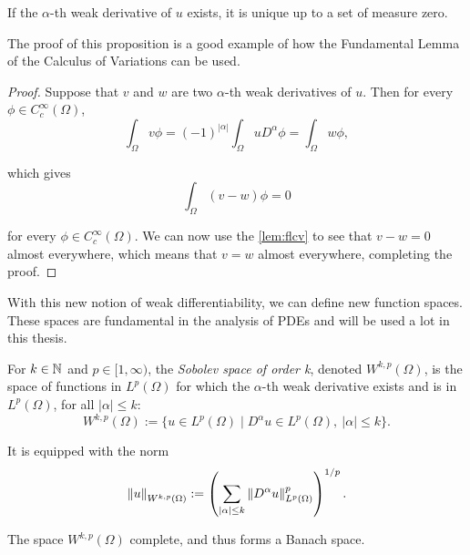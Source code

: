 \begin{proposition}{}{}
    If the $\alpha$-th weak derivative of $u$ exists, it is unique up to a set of measure zero.
\end{proposition}

The proof of this proposition is a good example of how the Fundamental Lemma of the Calculus of Variations can be used.

\begin{proof}
    Suppose that $v$ and $w$ are two $\alpha$-th weak derivatives of $u$. Then for every $\phi \in C^{\infty}_{c}(\Omega)$,
    \begin{equation*}
        \int_{\Omega} v \phi = (-1)^{|\alpha|} \int_{\Omega} u D^{\alpha} \phi = \int_{\Omega} w \phi ,
    \end{equation*}

    \noindent
    which gives
%
    \begin{equation*}
        \int_{\Omega} (v - w) \phi = 0
    \end{equation*}

    \noindent
    for every $\phi \in C^{\infty}_{c}(\Omega)$. We can now use the \cref{lem:flcv} to see that $v - w = 0$ almost everywhere, which means that $v = w$ almost everywhere, completing the proof.
\end{proof}

With this new notion of weak differentiability, we can define new function spaces. These spaces are fundamental in the analysis of PDEs and will be used a lot in this thesis. 

\begin{definition}{}{}
    For $k \in \mathbb{N}$ and $p \in [1, \infty)$, the \emph{Sobolev space of order k}, denoted $W^{k, p}(\Omega)$, is the space of functions in $L^p(\Omega)$ for which the $\alpha$-th weak derivative exists and is in $L^{p}(\Omega)$, for all $|\alpha| \leq k$:
%
    \begin{equation*}
        W^{k, p}(\Omega) := \{ u \in L^{p}(\Omega) \mid D^{\alpha} u \in L^{p}(\Omega),\ |\alpha| \leq k \} .
    \end{equation*}
    
    It is equipped with the norm
    \begin{equation*}
        \left\| u \right\|_{W^{k,p}(\Omega)} := \left( \sum_{|\alpha| \leq k} \left\| D^\alpha u \right\|_{L^p(\Omega)}^p \right)^{1/p} .
    \end{equation*}

    The space $W^{k, p}(\Omega)$ complete, and thus forms a Banach space.

\end{definition}

